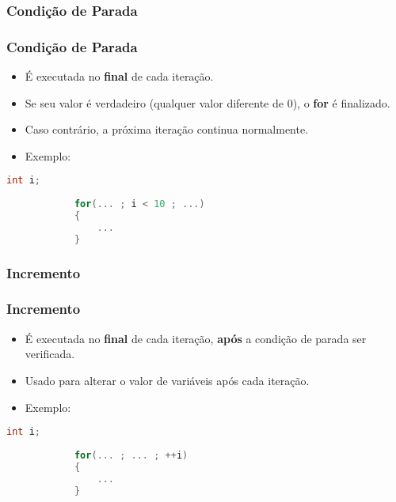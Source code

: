 \subsubsection{Condição de Parada}

\begin{frame}[fragile]
    \frametitle{Condição de Parada}
    
        \begin{itemize}
            
            \item É executada no \textbf{final} de cada iteração.
    
            \item Se seu valor é verdadeiro (qualquer valor diferente de 0), o \textbf{for} é finalizado.

            \item Caso contrário, a próxima iteração continua normalmente.
    
            \item Exemplo:
    
        \end{itemize}
    
        \begin{lstlisting}[language=C]
            int i;
    
            for(... ; i < 10 ; ...)
            {
                ...
            }
        \end{lstlisting}
    
\end{frame}






\subsubsection{Incremento}

\begin{frame}[fragile]
    \frametitle{Incremento}
    
        \begin{itemize}
            
            \item É executada no \textbf{final} de cada iteração, \textbf{após} a condição de parada ser verificada.
    
            \item Usado para alterar o valor de variáveis após cada iteração.
    
            \item Exemplo:
    
        \end{itemize}
    
        \begin{lstlisting}[language=C]
            int i;
    
            for(... ; ... ; ++i)
            {
                ...
            }
        \end{lstlisting}
    
\end{frame}




